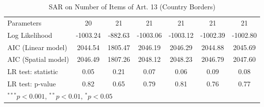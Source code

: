 \begin{table}[!h]
\begin{center}
\begin{tabular}{l c c c c c c }
Parameters              & 20           & 21           & 21           & 21           & 21           & 21           \\
Log Likelihood          & -1003.24     & -882.63      & -1003.06     & -1003.12     & -1002.39     & -1002.80     \\
AIC (Linear model)      & 2044.54      & 1805.47      & 2046.19      & 2046.29      & 2044.88      & 2045.69      \\
AIC (Spatial model)     & 2046.49      & 1807.26      & 2048.12      & 2048.23      & 2046.79      & 2047.60      \\
LR test: statistic      & 0.05         & 0.21         & 0.07         & 0.06         & 0.09         & 0.08         \\
LR test: p-value        & 0.82         & 0.65         & 0.79         & 0.81         & 0.76         & 0.77         \\
\bottomrule
\multicolumn{7}{l}{\scriptsize{$^{***}p<0.001$, $^{**}p<0.01$, $^*p<0.05$}}
\end{tabular}
\caption{SAR on Number of Items of Art. 13 (Country Borders)}
\label{table:coefficients}
\end{center}
\end{table}
